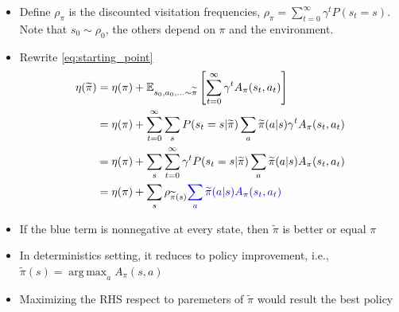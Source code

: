 \documentclass[9pt]{beamer}
\def\blue{\color{blue}}
\DeclareMathOperator*{\argmax}{arg\,max}
\theoremstyle{remark}
\begin{document}
\begin{frame}
    \begin{itemize}
        \item Define $\rho_\pi$ is the discounted visitation frequencies, $\rho_\pi = \sum^{\infty}_{t=0} \gamma^{t} P(s_t = s)$. Note that $s_0 \sim \rho_0$, the others depend on $\pi$ and the environment.
        \item Rewrite \eqref{eq:starting_point}
        \begin{align*}
            \eta(\widetilde{\pi}) 
            &= \eta(\pi) + \mathbb{E}_{s_0, a_0, \ldots  \sim \widetilde{\pi}} \left[ \sum^{\infty}_{t=0} \gamma^{t} A_\pi(s_t, a_t) \right] \\
            &= \eta(\pi) + \sum^{\infty}_{t=0} \sum_{s} P(s_t= s| \widetilde{\pi}) \sum_{a} \widetilde{\pi}(a|s) \gamma^{t} A_\pi(s_t, a_t)  \\
            &= \eta(\pi) +  \sum_{s} \sum^{\infty}_{t=0} \gamma^{t}  P(s_t= s| \widetilde{\pi}) \sum_{a} \widetilde{\pi}(a|s) A_\pi(s_t, a_t)  \\
            &= \eta(\pi) +  \sum_{s} \rho_{\widetilde{\pi}(s)} {\blue \sum_{a} \widetilde{\pi}(a|s) A_\pi(s_t, a_t)}
        \end{align*} 
    \item If the blue term is nonnegative at every state, then $\widetilde{\pi}$ is better or equal $\pi$
    \item In deterministics setting, it reduces to policy improvement, i.e., $\widetilde{\pi}(s)  = \argmax_a A_{\pi}(s, a)$
    \item Maximizing the RHS respect to paremeters of $\widetilde{\pi}$ would result the best policy
    \end{itemize}
\end{frame}
\end{document}
